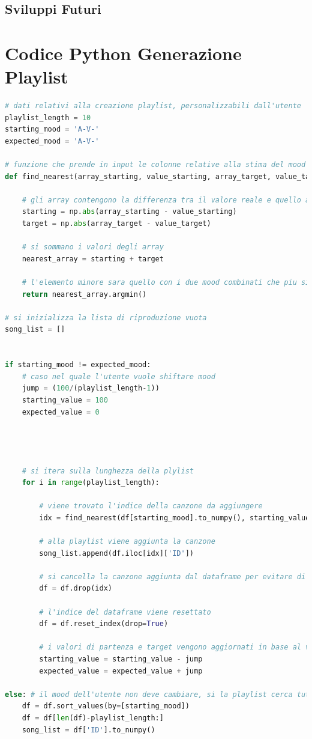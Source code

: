 \documentclass[11pt]{report}
\begin{document}
\section{Sviluppi Futuri}




\newpage

\appendix
\chapter{Codice Python Generazione Playlist}
\begin{lstlisting}[language=Python, caption=Playlist-Generator.py]
# dati relativi alla creazione playlist, personalizzabili dall'utente
playlist_length = 10
starting_mood = 'A-V-'
expected_mood = 'A-V-'

# funzione che prende in input le colonne relative alla stima del mood e il valore atteso a cui esse devono avvicinarsi
def find_nearest(array_starting, value_starting, array_target, value_target):
    
    # gli array contengono la differenza tra il valore reale e quello atteso
    starting = np.abs(array_starting - value_starting)
    target = np.abs(array_target - value_target)
    
    # si sommano i valori degli array
    nearest_array = starting + target
    
    # l'elemento minore sara quello con i due mood combinati che piu si avvicinano all obiettivo
    return nearest_array.argmin()

# si inizializza la lista di riproduzione vuota 
song_list = []


if starting_mood != expected_mood: 
    # caso nel quale l'utente vuole shiftare mood
    jump = (100/(playlist_length-1))
    starting_value = 100
    expected_value = 0




    # si itera sulla lunghezza della plylist
    for i in range(playlist_length):

        # viene trovato l'indice della canzone da aggiungere
        idx = find_nearest(df[starting_mood].to_numpy(), starting_value, df[expected_mood].to_numpy(), expected_value)
        
        # alla playlist viene aggiunta la canzone
        song_list.append(df.iloc[idx]['ID'])
        
        # si cancella la canzone aggiunta dal dataframe per evitare di aggiungerla due volte alla playlist
        df = df.drop(idx)
        
        # l'indice del dataframe viene resettato
        df = df.reset_index(drop=True)
        
        # i valori di partenza e target vengono aggiornati in base al valore del salto
        starting_value = starting_value - jump
        expected_value = expected_value + jump
        
else: # il mood dell'utente non deve cambiare, si la playlist cerca tutte le canzoni con il mood richiesto massimizzato
    df = df.sort_values(by=[starting_mood])
    df = df[len(df)-playlist_length:]
    song_list = df['ID'].to_numpy()
\end{lstlisting}




\end{document}
